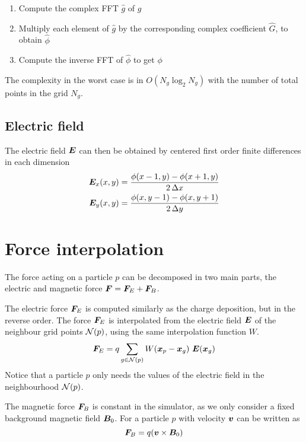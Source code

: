 %
\begin{enumerate}
\item Compute the complex FFT $\hat g$ of $g$
\item Multiply each element of $\hat g$ by the corresponding complex coefficient 
$\hat G$, to obtain $\hat \phi$
\item Compute the inverse FFT of $\hat \phi$ to get $\phi$
\end{enumerate}
%
The complexity in the worst case is in $O(N_g \log_2 N_g)$ with the number of 
total points in the grid $N_g$.

\subsection{Electric field}
The electric field $\bm{E}$ can then be obtained by centered first order finite 
differences in each dimension
%
\begin{equation}%
\begin{split}
\label{eq:phi-to-E}
\E_x(x,y) &= \frac{\phi(x-1,y) - \phi(x+1,y)}{2\,\Delta x} \\
\E_y(x,y) &= \frac{\phi(x,y-1) - \phi(x,y+1)}{2\,\Delta y}
\end{split}
\end{equation}%
%

\section{Force interpolation}

The force acting on a particle $p$ can be decomposed in two main parts, the 
electric and magnetic force $\bm{F}=\bm{F}_E + \bm{F}_B$.

The electric force $\bm{F}_E$ is computed similarly as the charge deposition, but in 
the reverse order. The force $\bm{F}_E$ is interpolated from the electric field $\bm{E}$ 
of the neighbour grid points $\mathcal{N}(p)$, using the same interpolation function 
$W$.
\begin{equation}%
\begin{split}
\F_E &= q \sum_{g \in \neigh{p}} W(\x_p - \x_g)\ \E(\x_g) \\
\end{split}
\end{equation}%
Notice that a particle $p$ only needs the values of the electric field in the 
neighbourhood $\mathcal{N}(p)$.

The magnetic force $\bm{F}_B$ is constant in the simulator, as we only consider a 
fixed background magnetic field $\bm{B}_0$. For a particle $p$ with velocity $\bm{v}$  
can be written as
%
\begin{equation}%
\F_B = q (\v \times \B_0)
\end{equation}%


